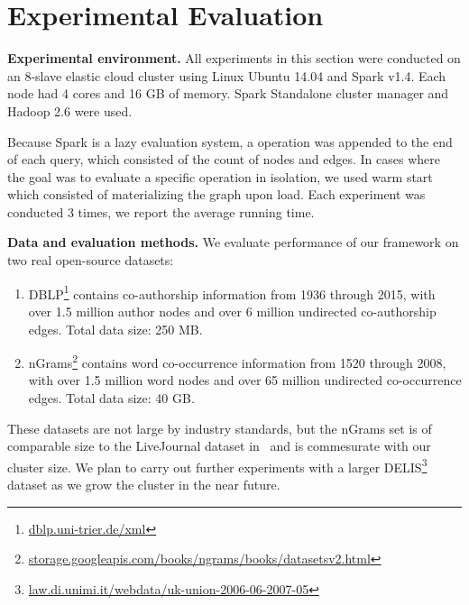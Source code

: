 \section{Experimental Evaluation}
\label{sec:exp}

{\bf Experimental environment.} All experiments in this section were
conducted on an 8-slave elastic cloud cluster using Linux Ubuntu 14.04
and Spark v1.4.  Each node had 4 cores and 16 GB of memory.  Spark
Standalone cluster manager and Hadoop 2.6 were used.

Because Spark is a lazy evaluation system, a 
operation was appended to the end of each query, which consisted of
the count of nodes and edges.  In cases where the goal was to evaluate
a specific operation in isolation, we used warm start which consisted
of materializing the graph upon load.  Each experiment was conducted 3
times, we report the average running time. 

{\bf Data and evaluation methods.}  We evaluate performance of our
framework on two real open-source datasets:

\begin{enumerate}%

\item DBLP\footnote{\url{dblp.uni-trier.de/xml}} contains
  co-authorship information from 1936 \linebreak through 2015, with over 1.5
  million author nodes and over 6 million undirected co-authorship
  edges.  Total data size: 250 MB.

\item nGrams\footnote{\url{storage.googleapis.com/books/ngrams/books/datasetsv2.html}}
  contains word co-occurrence information from 1520 through 2008, with
  over 1.5 million word nodes and over 65 million undirected
  co-occurrence edges.  Total data size: 40 GB.
\end{enumerate}

These datasets are not large by industry standards, but
the nGrams set is of comparable size to the LiveJournal dataset
in~\cite{Xin2013} and is commesurate with our cluster size.  We plan to
carry out further experiments with a larger
DELIS\footnote{\url{law.di.unimi.it/webdata/uk-union-2006-06-2007-05}}
dataset as we grow the cluster in the near future.

